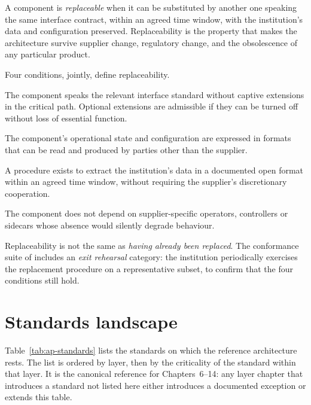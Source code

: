 A component is \emph{replaceable} when it can be substituted by
another one speaking the same interface contract, within an agreed
time window, with the institution's data and configuration preserved.
Replaceability is the property that makes the architecture survive
supplier change, regulatory change, and the obsolescence of any
particular product.

Four conditions, jointly, define replaceability.

\begin{description}[leftmargin=1.5em,style=nextline,nosep]
  \item[Standard interfaces.] The component speaks the relevant
    interface standard without captive extensions in the critical
    path. Optional extensions are admissible if they can be turned
    off without loss of essential function.
  \item[Open state and configuration formats.] The component's
    operational state and configuration are expressed in formats that
    can be read and produced by parties other than the supplier.
  \item[Documented exit-data export.] A procedure exists to extract
    the institution's data in a documented open format within an
    agreed time window, without requiring the supplier's discretionary
    cooperation.
  \item[No hidden dependencies.] The component does not depend on
    supplier-specific operators, controllers or sidecars whose absence
    would silently degrade behaviour.
\end{description}

Replaceability is not the same as \emph{having already been replaced}.
The conformance suite of
 includes an \emph{exit rehearsal} category:
the institution periodically exercises the replacement procedure on a
representative subset, to confirm that the four conditions still
hold.

\section{Standards landscape}
\label{sec:ap-standards}

Table~\ref{tab:ap-standards} lists the standards on which the
reference architecture rests. The list is ordered by layer, then by
the criticality of the standard within that layer. It is the canonical
reference for Chapters~6--14: any layer chapter that introduces a
standard not listed here either introduces a documented exception or
extends this table.

